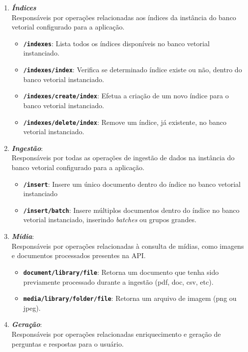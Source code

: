 \documentclass[a4paper, 12pt]{article}
\begin{document}
    \begin{enumerate}
        \item \textbf{\textit{Índices}}\\
        Responsáveis por operações relacionadas aos índices da instância do banco vetorial configurado para a aplicação.
        \begin{itemize}
            \item \textbf{\texttt{/indexes}}: Lista todos os índices disponíveis no banco vetorial instanciado.
            \item \textbf{\texttt{/indexes/index}}: Verifica se determinado índice existe ou não, dentro do banco vetorial instanciado.
            \item \textbf{\texttt{/indexes/create/index}}: Efetua a criação de um novo índice para o banco vetorial instanciado.
            \item \textbf{\texttt{/indexes/delete/index}}: Remove um índice, já existente, no banco vetorial instanciado.
        \end{itemize}
        \item \textbf{\textit{Ingestão}}:\\ Responsáveis por todas as operações de ingestão de dados na instância do banco vetorial configurado para a aplicação.
        \begin{itemize}
            \item \textbf{\texttt{/insert}}: Insere um único documento dentro do índice no banco vetorial instanciado
            \item \textbf{\texttt{/insert/batch}}: Insere múltiplos documentos dentro do índice no banco vetorial instanciado, inserindo \textit{batches} ou grupos grandes.
        \end{itemize}
        \item \textbf{\textit{Mídia}}:\\ Responsáveis por operações relacionadas à consulta de mídias, como imagens e documentos processados presentes na API.
        \begin{itemize}
            \item \textbf{\texttt{document/library/file}}: Retorna um documento que tenha sido previamente processado durante a ingestão (pdf, doc, csv, etc).
            \item \textbf{\texttt{media/library/folder/file}}: Retorna um arquivo de imagem (png ou jpeg).
        \end{itemize}
        \item \textbf{\textit{Geração}}:\\ Responsáveis por operações relacionadas enriquecimento e geração de perguntas e respostas para o usuário.

\end{enumerate}
\end{document}

